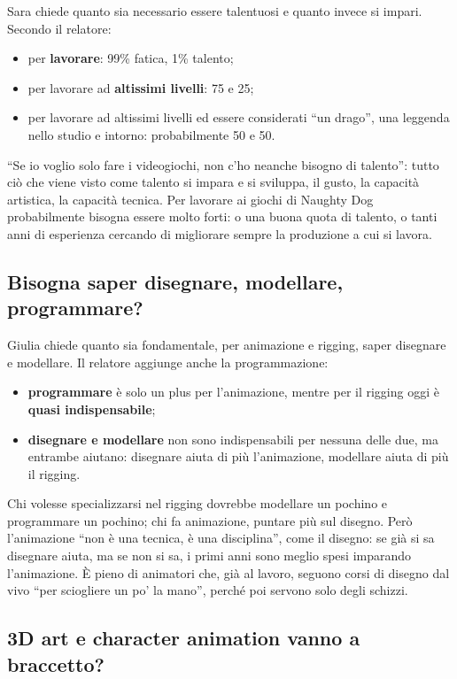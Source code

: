 Sara chiede quanto sia necessario essere talentuosi e quanto invece si
impari. Secondo il relatore:
\begin{itemize}
  \item per \textbf{lavorare}: 99\% fatica, 1\% talento;
  \item per lavorare ad \textbf{altissimi livelli}: 75 e 25;
  \item per lavorare ad altissimi livelli ed essere considerati ``un drago'',
        una leggenda nello studio e intorno: probabilmente 50 e 50.
\end{itemize}
``Se io voglio solo fare i videogiochi, non c'ho neanche bisogno di talento'':
tutto ciò che viene visto come talento si impara e si sviluppa, il gusto, la
capacità artistica, la capacità tecnica. Per lavorare ai giochi di Naughty
Dog probabilmente bisogna essere molto forti: o una buona quota di talento, o
tanti anni di esperienza cercando di migliorare sempre la produzione a cui si
lavora.

\subsection{Bisogna saper disegnare, modellare, programmare?}

Giulia chiede quanto sia fondamentale, per animazione e rigging, saper
disegnare e modellare. Il relatore aggiunge anche la programmazione:
\begin{itemize}
  \item \textbf{programmare} è solo un plus per l'animazione, mentre per il
        rigging oggi è \textbf{quasi indispensabile};
  \item \textbf{disegnare e modellare} non sono indispensabili per nessuna
        delle due, ma entrambe aiutano: disegnare aiuta di più l'animazione,
        modellare aiuta di più il rigging.
\end{itemize}
Chi volesse specializzarsi nel rigging dovrebbe modellare un pochino e
programmare un pochino; chi fa animazione, puntare più sul disegno. Però
l'animazione ``non è una tecnica, è una disciplina'', come il disegno: se già
si sa disegnare aiuta, ma se non si sa, i primi anni sono meglio spesi
imparando l'animazione. È pieno di animatori che, già al lavoro, seguono corsi
di disegno dal vivo ``per sciogliere un po' la mano'', perché poi servono
solo degli schizzi.

\subsection{3D art e character animation vanno a braccetto?}

